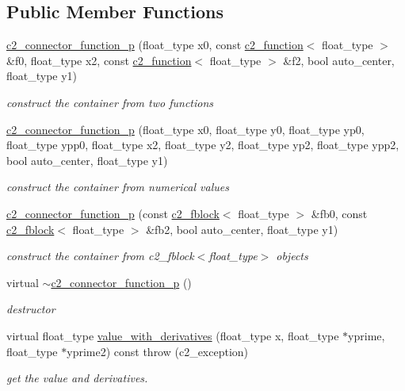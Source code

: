 \subsection*{Public Member Functions}
\begin{DoxyCompactItemize}
\item 
\hyperlink{classc2__connector__function__p_a7827c6d4a19b57d2c63ac384cb91211c}{c2\-\_\-connector\-\_\-function\-\_\-p} (float\-\_\-type x0, const \hyperlink{classc2__function}{c2\-\_\-function}$<$ float\-\_\-type $>$ \&f0, float\-\_\-type x2, const \hyperlink{classc2__function}{c2\-\_\-function}$<$ float\-\_\-type $>$ \&f2, bool auto\-\_\-center, float\-\_\-type y1)
\begin{DoxyCompactList}\small\item\em construct the container from two functions \end{DoxyCompactList}\item 
\hyperlink{classc2__connector__function__p_a2445b30d02a6a968b0c36d39feefc537}{c2\-\_\-connector\-\_\-function\-\_\-p} (float\-\_\-type x0, float\-\_\-type y0, float\-\_\-type yp0, float\-\_\-type ypp0, float\-\_\-type x2, float\-\_\-type y2, float\-\_\-type yp2, float\-\_\-type ypp2, bool auto\-\_\-center, float\-\_\-type y1)
\begin{DoxyCompactList}\small\item\em construct the container from numerical values \end{DoxyCompactList}\item 
\hyperlink{classc2__connector__function__p_a359df91e0d5560c772cea46b22d7181c}{c2\-\_\-connector\-\_\-function\-\_\-p} (const \hyperlink{classc2__fblock}{c2\-\_\-fblock}$<$ float\-\_\-type $>$ \&fb0, const \hyperlink{classc2__fblock}{c2\-\_\-fblock}$<$ float\-\_\-type $>$ \&fb2, bool auto\-\_\-center, float\-\_\-type y1)
\begin{DoxyCompactList}\small\item\em construct the container from c2\-\_\-fblock$<$float\-\_\-type$>$ objects \end{DoxyCompactList}\item 
\hypertarget{classc2__connector__function__p_a3cf5737490d0653f6421cb8ea8390cbf}{virtual \hyperlink{classc2__connector__function__p_a3cf5737490d0653f6421cb8ea8390cbf}{$\sim$c2\-\_\-connector\-\_\-function\-\_\-p} ()}\label{classc2__connector__function__p_a3cf5737490d0653f6421cb8ea8390cbf}

\begin{DoxyCompactList}\small\item\em destructor \end{DoxyCompactList}\item 
virtual float\-\_\-type \hyperlink{classc2__connector__function__p_a0c748860e1ef547a0cce583c01abe175}{value\-\_\-with\-\_\-derivatives} (float\-\_\-type x, float\-\_\-type $\ast$yprime, float\-\_\-type $\ast$yprime2) const   throw (c2\-\_\-exception)
\begin{DoxyCompactList}\small\item\em get the value and derivatives. \end{DoxyCompactList}\end{DoxyCompactItemize}
